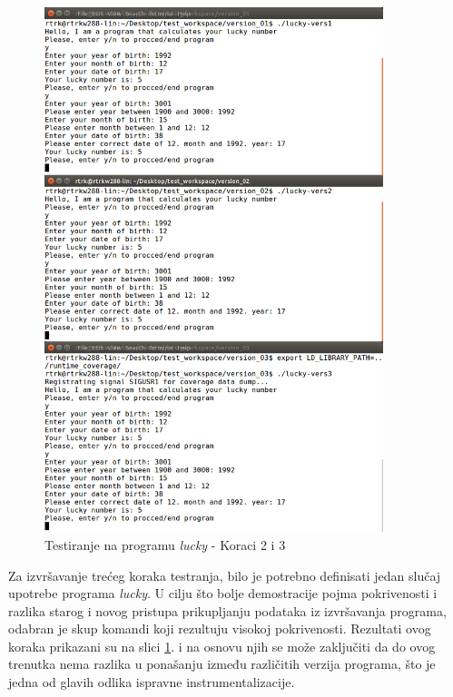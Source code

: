 \documentclass[12pt,oneside]{memoir}
\newcommand{\strano}[1]{\textit{#1}}
\begin{document}
\begin{figure}[!ht]
  \centering
  \includegraphics[width=0.88\textwidth]{img/lucky2-ng.png}
  \caption{Testiranje na programu \strano{lucky} - Koraci 2 i 3}
  \label{fig:lucky-test-2}
\end{figure}

Za izvršavanje trećeg koraka testranja, bilo je potrebno definisati jedan slučaj upotrebe programa \strano{lucky}. U cilju što bolje demostracije pojma pokrivenosti i razlika starog i novog pristupa prikupljanju podataka iz izvršavanja programa, odabran je skup komandi koji rezultuju visokoj pokrivenosti. Rezultati ovog koraka prikazani su na slici \ref{fig:lucky-test-2}. i na osnovu njih se može zaključiti da do ovog trenutka nema razlika u ponašanju između različitih verzija programa, što je jedna od glavih odlika ispravne instrumentalizacije. 
\end{document}
